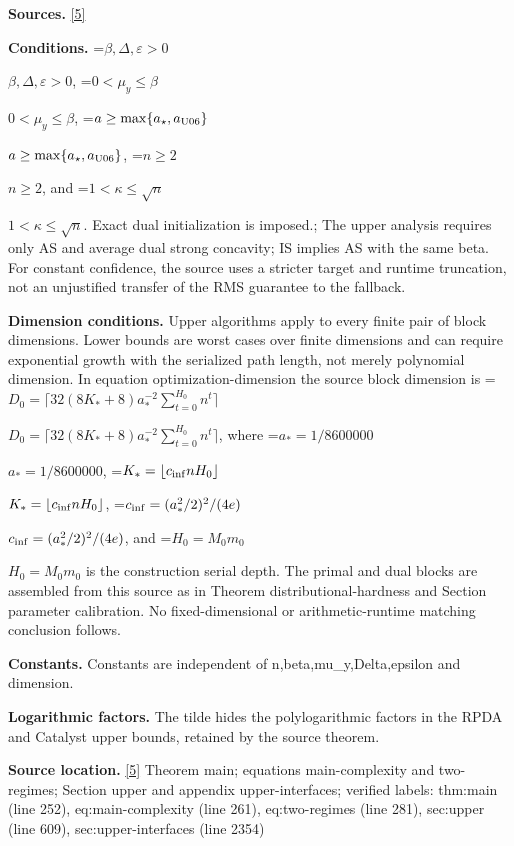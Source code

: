 \documentclass[10pt,a4paper]{article}
\newcommand{\AtlasMath}[1]{\par\begingroup\centering\setbox0=\hbox{$\displaystyle #1$}\ifdim\wd0>1.4\linewidth\typeout{ATLAS WIDE FORMULA: \the\wd0}\fi\ifdim\wd0>\linewidth\resizebox{\linewidth}{!}{\box0}\else\box0\fi\par\endgroup}
\newcommand{\AtlasInlineMath}[1]{\begingroup\setbox0=\hbox{$#1$}\ifdim\wd0>.4\linewidth\endgroup\AtlasMath{#1}\else\endgroup$#1$\fi}
\begin{document}
\textbf{Sources.} \href{https://github.com/WU-Wendao/Colombo/blob/main/colombo_sensorium/Complexity_altas/data/sources/colombo/U06/manuscript.pdf}{[5]}



\textbf{Conditions.} \AtlasInlineMath{\beta,\Delta,\varepsilon>0}, \AtlasInlineMath{0<\mu_y\le\beta}, \AtlasInlineMath{a\ge\max\{a_\star,a_{\rm U06}\}}, \AtlasInlineMath{n\ge2}, and \AtlasInlineMath{1<\kappa\le\sqrt n}. Exact dual initialization is imposed.; The upper analysis requires only AS and average dual strong concavity; IS implies AS with the same beta. For constant confidence, the source uses a stricter target and runtime truncation, not an unjustified transfer of the RMS guarantee to the fallback.



\textbf{Dimension conditions.} Upper algorithms apply to every finite pair of block dimensions. Lower bounds are worst cases over finite dimensions and can require exponential growth with the serialized path length, not merely polynomial dimension. In equation optimization-dimension the source block dimension is \AtlasInlineMath{D_0=\lceil32(8K_*+8)a_*^{-2}\sum_{t=0}^{H_0}n^t\rceil}, where \AtlasInlineMath{a_*=1/8600000}, \AtlasInlineMath{K_*=\lfloor c_{\rm inf}nH_0\rfloor}, \AtlasInlineMath{c_{\rm inf}=(a_*^2/2)^2/(4e)}, and \AtlasInlineMath{H_0=M_0m_0} is the construction serial depth. The primal and dual blocks are assembled from this source as in Theorem distributional-hardness and Section parameter calibration. No fixed-dimensional or arithmetic-runtime matching conclusion follows.



\textbf{Constants.} Constants are independent of n,beta,mu\_y,Delta,epsilon and dimension.



\textbf{Logarithmic factors.} The tilde hides the polylogarithmic factors in the RPDA and Catalyst upper bounds, retained by the source theorem.



\textbf{Source location.} \href{https://github.com/WU-Wendao/Colombo/blob/main/colombo_sensorium/Complexity_altas/data/sources/colombo/U06/manuscript.pdf}{[5]} Theorem main; equations main-complexity and two-regimes; Section upper and appendix upper-interfaces; verified labels: thm:main (line 252), eq:main-complexity (line 261), eq:two-regimes (line 281), sec:upper (line 609), sec:upper-interfaces (line 2354)
\end{document}
